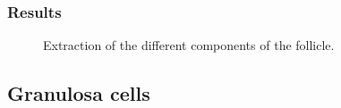 \subsubsection{Results}
\begin{figure}[H]
\centering\caption{Extraction of the different components of the follicle.}%
 
 \hfill
 \hfill
 \label{fig:segfollicle:python:vascularization}%
\end{figure}

\subsection{Granulosa cells}

